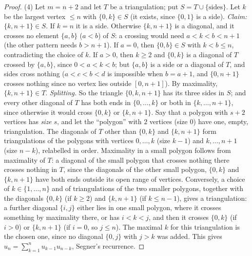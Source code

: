 \begin{proof}
(4) Let $m = n + 2$ and let $T$ be a triangulation; put $S = T \cup \{\text{sides}\}$. Let $k$ be the largest vertex $\leq n$ with $\{0, k\} \in S$ (it exists, since $\{0, 1\}$ is a side).
\emph{Claim: $\{k, n + 1\} \in S$.} If $k = n$ it is a side. Otherwise $\{k, n + 1\}$ is a diagonal, and it crosses no element $\{a, b\}$ ($a < b$) of $S$: a crossing would need $a < k < b < n + 1$
(the other pattern needs $b > n + 1$). If $a = 0$, then $\{0, b\} \in S$ with $k < b \leq n$, contradicting the choice of $k$. If $a > 0$, then $k \geq 2$ and $\{0, k\}$ is a diagonal of $T$ crossed by
$\{a, b\}$, since $0 < a < k < b$; but $\{a, b\}$ is a side or a diagonal of $T$, and sides cross nothing ($a < c < b < d$ is impossible when $b = a + 1$, and $\{0, n + 1\}$ crosses nothing since no vertex
lies outside $[0, n + 1]$). By maximality, $\{k, n + 1\} \in T$.
\emph{Splitting.} So the triangle $\{0, k, n + 1\}$ has its three sides in $S$; and every other diagonal of $T$ has both ends in $\{0, \ldots, k\}$ or both in $\{k, \ldots, n + 1\}$, since otherwise it
would cross $\{0, k\}$ or $\{k, n + 1\}$. Say that a polygon with $s + 2$ vertices has \emph{size} $s$, and let the ``polygon'' with $2$ vertices (size $0$) have one, empty, triangulation. The diagonals of $T$ other than $\{0, k\}$ and
$\{k, n + 1\}$ form triangulations of the polygons with vertices $0, \ldots, k$ (size $k - 1$) and $k, \ldots, n + 1$ (size $n - k$), relabelled in order. Maximality in a small polygon follows from
maximality of $T$: a diagonal of the small polygon that crosses nothing there crosses nothing in $T$, since the diagonals of the other small polygon, $\{0, k\}$ and $\{k, n + 1\}$ have both ends
outside its open range of vertices. Conversely, a choice of $k \in \{1, \ldots, n\}$ and of triangulations of the two smaller polygons, together with the diagonals $\{0, k\}$ (if $k \geq 2$) and
$\{k, n + 1\}$ (if $k \leq n - 1$), gives a triangulation: a further diagonal $\{i, j\}$ either lies in one small polygon, where it crosses something by maximality there, or has $i < k < j$, and then
it crosses $\{0, k\}$ (if $i > 0$) or $\{k, n + 1\}$ (if $i = 0$, so $j \leq n$). The maximal $k$ for this triangulation is the chosen one, since no diagonal $\{0, j\}$ with $j > k$ was added. This gives $u_n = \sum_{k=1}^{n}u_{k-1}u_{n-k}$, Segner's recurrence.


\end{proof}

